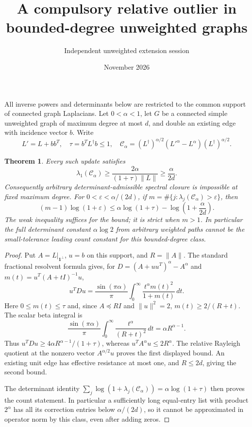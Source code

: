 \documentclass[11pt]{article}
\newtheorem{theorem}{Theorem}
\newcommand{\C}{\mathcal C_\alpha}
\begin{document}
\title{A compulsory relative outlier in bounded-degree unweighted graphs}
\author{Independent unweighted extension session}\date{November 2026}
\maketitle

All inverse powers and determinants below are restricted to the common
support of connected graph Laplacians. Let $0<\alpha<1$, let $G$ be a
connected simple unweighted graph of maximum degree at most $d$, and
double an existing edge with incidence vector $b$. Write
\[
 L'=L+bb^T,\quad \tau=b^TL^\dagger b\le1,\quad
 \C=(L^\dagger)^{\alpha/2}(L'^\alpha-L^\alpha)
                                      (L^\dagger)^{\alpha/2}.
\]

\begin{theorem}
Every such update satisfies
\[
 \lambda_1(\C)\ge \frac{2\alpha}{(1+\tau)\|L\|}
                     \ge \frac{\alpha}{2d}.
\]
Consequently arbitrary determinant-admissible spectral closure is
impossible at fixed maximum degree. For $0<\varepsilon<\alpha/(2d)$,
if $m=\#\{j:\lambda_j(\C)>\varepsilon\}$, then
\[
 (m-1)\log(1+\varepsilon)
  \le \alpha\log(1+\tau)-\log\left(1+\frac{\alpha}{2d}\right).
\]
The weak inequality suffices for the bound; it is strict when $m>1$.
In particular the full determinant constant $\alpha\log2$ from arbitrary
weighted paths cannot be the small-tolerance leading count constant for
this bounded-degree class.
\end{theorem}

\begin{proof}
Put $A=L|_{\mathbf1^\perp}$, $u=b$ on this support, and $R=\|A\|$.
The standard fractional resolvent formula gives, for
$D=(A+uu^T)^\alpha-A^\alpha$ and
$m(t)=u^T(A+tI)^{-1}u$,
\[
 u^TDu=\frac{\sin(\pi\alpha)}{\pi}
                 \int_0^\infty\frac{t^\alpha m(t)^2}{1+m(t)}\,dt.
\]
Here $0\le m(t)\le\tau$ and, since $A\preceq RI$ and $\|u\|^2=2$,
$m(t)\ge 2/(R+t)$. The scalar beta integral is
\[
 \frac{\sin(\pi\alpha)}{\pi}
       \int_0^\infty\frac{t^\alpha}{(R+t)^2}\,dt
                              =\alpha R^{\alpha-1}.
\]
Thus $u^TDu\ge4\alpha R^{\alpha-1}/(1+\tau)$, whereas
$u^TA^\alpha u\le2R^\alpha$. The relative Rayleigh quotient at the
nonzero vector $A^{\alpha/2}u$ proves the first displayed bound.
An existing unit edge has effective resistance at most one, and
$R\le2d$, giving the second bound.

The determinant identity
$\sum_j\log(1+\lambda_j(\C))=\alpha\log(1+\tau)$
then proves the count statement. In particular a sufficiently long
equal-entry list with product $2^\alpha$ has all its correction entries
below $\alpha/(2d)$, so it cannot be approximated in operator norm by
this class, even after adding zeros.
\end{proof}
\end{document}
